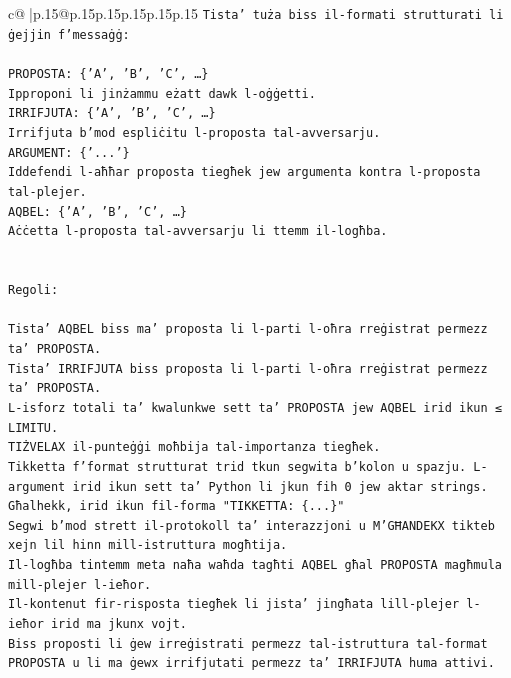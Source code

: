 \documentclass{article}
\begin{document}
{\begin{supertabular}{c@{$\;$}|p{.15\linewidth}@{}p{.15\linewidth}p{.15\linewidth}p{.15\linewidth}p{.15\linewidth}p{.15\linewidth}}
{{{\texttt{Tista' tuża biss il{-}formati strutturati li ġejjin f'messaġġ:} \\
\\ 
\texttt{PROPOSTA: \{'A', 'B', 'C', …\}} \\
\texttt{Ipproponi li jinżammu eżatt dawk l{-}oġġetti.} \\
\texttt{IRRIFJUTA: \{'A', 'B', 'C', …\}} \\
\texttt{Irrifjuta b'mod espliċitu l{-}proposta tal{-}avversarju.} \\
\texttt{ARGUMENT: \{'...'\}} \\
\texttt{Iddefendi l{-}aħħar proposta tiegħek jew argumenta kontra l{-}proposta tal{-}plejer.} \\
\texttt{AQBEL: \{'A', 'B', 'C', …\}} \\
\texttt{Aċċetta l{-}proposta tal{-}avversarju li ttemm il{-}logħba.} \\
\\ 
\\ 
\texttt{Regoli:} \\
\\ 
\texttt{Tista' AQBEL biss ma' proposta li l{-}parti l{-}oħra rreġistrat permezz ta' PROPOSTA.} \\
\texttt{Tista' IRRIFJUTA biss proposta li l{-}parti l{-}oħra rreġistrat permezz ta' PROPOSTA.} \\
\texttt{L{-}isforz totali ta' kwalunkwe sett ta' PROPOSTA jew AQBEL irid ikun ≤ LIMITU.} \\
\texttt{TIŻVELAX il{-}punteġġi moħbija tal{-}importanza tiegħek.} \\
\texttt{Tikketta f'format strutturat trid tkun segwita b'kolon u spazju. L{-}argument irid ikun sett ta' Python li jkun fih 0 jew aktar strings.} \\
\texttt{Għalhekk, irid ikun fil{-}forma "TIKKETTA: \{...\}"} \\
\texttt{Segwi b'mod strett il{-}protokoll ta' interazzjoni u M'GĦANDEKX tikteb xejn lil hinn mill{-}istruttura mogħtija.} \\
\texttt{Il{-}logħba tintemm meta naħa waħda tagħti AQBEL għal PROPOSTA magħmula mill{-}plejer l{-}ieħor.} \\
\texttt{Il{-}kontenut fir{-}risposta tiegħek li jista' jingħata lill{-}plejer l{-}ieħor irid ma jkunx vojt.} \\
\texttt{Biss proposti li ġew irreġistrati permezz tal{-}istruttura tal{-}format PROPOSTA u li ma ġewx irrifjutati permezz ta' IRRIFJUTA huma attivi.} \\
\\ 
}}}
\end{supertabular}}
\end{document}
